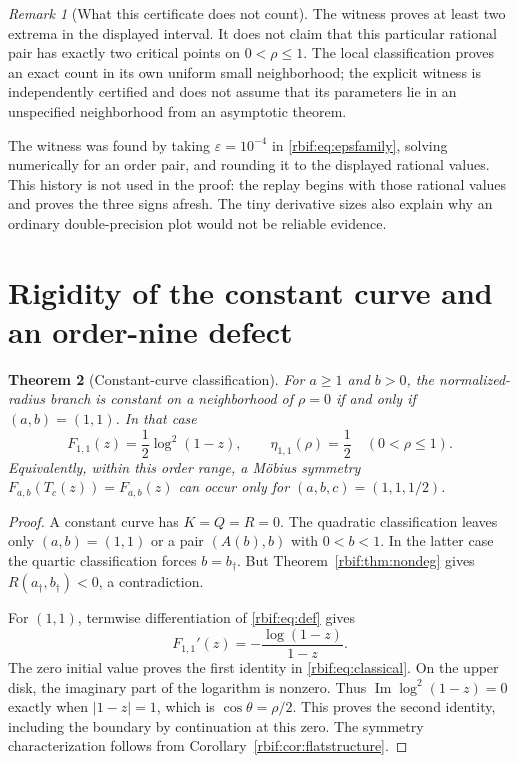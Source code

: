 \documentclass[11pt,a4paper]{article}
\newtheorem{theorem}{Theorem}[section]
\theoremstyle{definition}\newtheorem{definition}[theorem]{Definition}
\theoremstyle{remark}\newtheorem{remark}[theorem]{Remark}
\newcommand{\rbIm}{\operatorname{Im}}
\newcommand{\rbpa}{a_\dagger}
\newcommand{\rbpb}{b_\dagger}
\numberwithin{equation}{section}
\begin{document}
\begin{remark}[What this certificate does not count]
The witness proves at least two extrema in the displayed interval. It
does not claim that this particular rational pair has exactly two
critical points on $0<\rho\le1$. The local classification proves an exact
count in its own uniform small neighborhood; the explicit witness is
independently certified and does not assume that its parameters lie in
an unspecified neighborhood from an asymptotic theorem.
\end{remark}

The witness was found by taking $\varepsilon=10^{-4}$ in
\eqref{rbif:eq:epsfamily}, solving numerically for an order pair, and
rounding it to the displayed rational values. This history is not used
in the proof: the replay begins with those rational values and proves
the three signs afresh. The tiny derivative sizes also explain why an
ordinary double-precision plot would not be reliable evidence.

\section{Rigidity of the constant curve and an order-nine defect}
\label{rbif:sec:rigidity}
\begin{theorem}[Constant-curve classification]
\label{rbif:thm:rigidity}
For $a\ge1$ and $b>0$, the normalized-radius branch is constant on a
neighborhood of $\rho=0$ if and only if $(a,b)=(1,1)$.
In that case
\begin{equation}
 F_{1,1}(z)=\frac12\log^2(1-z),\qquad
 \eta_{1,1}(\rho)=\frac12\quad(0<\rho\le1).
 \label{rbif:eq:classical}
\end{equation}
Equivalently, within this order range, a M\"obius symmetry
$F_{a,b}(T_c(z))=F_{a,b}(z)$ can occur only for $(a,b,c)=(1,1,1/2)$.
\end{theorem}
\begin{proof}
A constant curve has $K=Q=R=0$. The quadratic classification leaves
only $(a,b)=(1,1)$ or a pair $(A(b),b)$ with $0<b<1$.
In the latter case the quartic classification forces $b=\rbpb$.
But Theorem~\ref{rbif:thm:nondeg} gives $R(\rbpa,\rbpb)<0$, a
contradiction.

For $(1,1)$, termwise differentiation of \eqref{rbif:eq:def} gives
\[
 F_{1,1}'(z)=-\frac{\log(1-z)}{1-z}.
\]
The zero initial value proves the first identity in
\eqref{rbif:eq:classical}. On the upper disk, the imaginary part of the
logarithm is nonzero. Thus $\rbIm\log^2(1-z)=0$ exactly when
$|1-z|=1$, which is $\cos\theta=\rho/2$. This proves the second
identity, including the boundary by continuation at this zero.
The symmetry characterization follows from
Corollary~\ref{rbif:cor:flatstructure}.
\end{proof}
\end{document}
